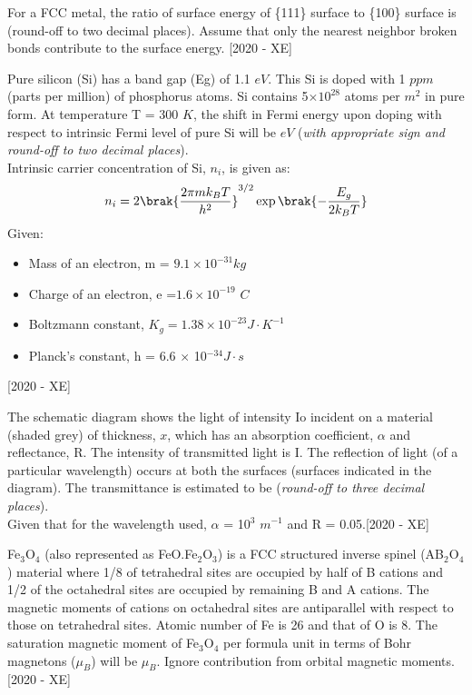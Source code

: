     \item For a FCC metal, the ratio of surface energy of \{111\} surface to \{100\} surface is \underline{\hspace{3cm}} (round-off to two decimal places). Assume that only the nearest neighbor broken bonds contribute to the surface energy. \hfill{[2020 - XE]}
    \item  Pure silicon (Si) has a band gap (Eg) of 1.1 $eV$. This Si is doped with 1 $ppm$ (parts per million) of phosphorus atoms. Si contains 5$\times 10^{28}$ atoms per $m^2$ in pure form. At temperature T = 300 $K$, the shift in Fermi energy upon doping with respect to intrinsic Fermi level of pure Si will be \underline{\hspace{3cm}} $eV$ (\textit{with appropriate sign and round-off to two decimal places}).\\
    Intrinsic carrier concentration of Si, $n_i$, is given as:
    $$n_i = 2\brak{\frac{2\pi mk_B T}{h^2}}^{3/2} \exp\brak{-\frac{E_g}{2k_B T}}$$
    Given:
    \begin{itemize}
        \item Mass of an electron, m = $9.1 \times 10^{-31} kg$
        \item Charge of an electron, e =$1.6 \times 10^{-19}$ $C$
        \item Boltzmann constant, $K_g = 1.38 \times 10^{-23} J\cdot K^{-1}$
        \item Planck's constant, h = 6.6 $\times$ 10$^{-34} J\cdot s$
    \end{itemize}\hfill{[2020 - XE]}
    \item The schematic diagram shows the light of intensity Io incident on a material (shaded grey) of thickness, $x$, which has an absorption coefficient, $\alpha$ and reflectance, R. The intensity of transmitted light is I. The reflection of light (of a particular wavelength) occurs at both the surfaces (surfaces indicated in the diagram). The transmittance is estimated to be \underline{\hspace{3cm}} (\textit{round-off to three decimal places}).\\
    Given that for the wavelength used, $\alpha$ = 10$^3$ $m^{-1}$ and R = 0.05.\hfill{[2020 - XE]}
    
    \item Fe$_3$O$_4$ (also represented as FeO.Fe$_2$O$_3$) is a FCC structured inverse spinel (AB$_2$O$_4$) material where 1/8 of tetrahedral sites are occupied by half of B cations and 1/2 of the octahedral sites are occupied by remaining B and A cations. The magnetic moments of cations on octahedral sites are antiparallel with respect to those on tetrahedral sites. Atomic number of Fe is 26 and that of O is 8. The saturation magnetic moment of Fe$_3$O$_4$ per formula unit in terms of Bohr magnetons ($\mu_B$) will be \underline{\hspace{3cm}} $\mu_B$. Ignore contribution from orbital magnetic moments. \hfill{[2020 - XE]}
